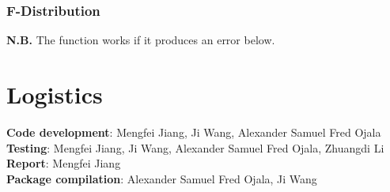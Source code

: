 \documentclass{article}\usepackage[]{graphicx}\usepackage[]{color}
\makeatletter
\newenvironment{kframe}{%
 \def\at@end@of@kframe{}%
 \ifinner\ifhmode%
  \def\at@end@of@kframe{\end{minipage}}%
  \begin{minipage}{\columnwidth}%
 \fi\fi%
 \def\FrameCommand##1{\hskip\@totalleftmargin \hskip-\fboxsep
 \colorbox{shadecolor}{##1}\hskip-\fboxsep
     \hskip-\linewidth \hskip-\@totalleftmargin \hskip\columnwidth}%
 \MakeFramed {\advance\hsize-\width
   \@totalleftmargin\z@ \linewidth\hsize
   \@setminipage}}%
 {\par\unskip\endMakeFramed%
 \at@end@of@kframe}
\newenvironment{knitrout}{}{} %
\makeatother
\begin{document}
\subsubsection{F-Distribution}
\textbf{N.B.} The function works if it produces an error below.
\begin{knitrout}
\color{fgcolor}\begin{kframe}


{\ttfamily\noindent\bfseries\color{errorcolor}{\#\# Error in ars(f\_pdf, n, 1e-05): Bad density: not log-concave}}\end{kframe}
\end{knitrout}

\section{Logistics}
\textbf{Code development}: Mengfei Jiang, Ji Wang, Alexander Samuel Fred Ojala\\
\textbf{Testing}: Mengfei Jiang, Ji Wang, Alexander Samuel Fred Ojala, Zhuangdi Li\\
\textbf{Report}: Mengfei Jiang\\
\textbf{Package compilation}: Alexander Samuel Fred Ojala, Ji Wang\\
\end{document}
